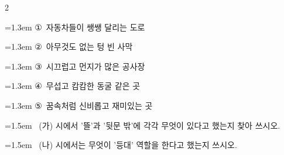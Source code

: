 \documentclass[12pt, a4paper]{article}
\begin{document}
\begin{multicols}{2}
\begin{minipage}{\columnwidth}
\vspace{0.5mm}
{\hangindent=1.3em  \noindent\hspace{0.3em}①~자동차들이 쌩쌩 달리는 도로\par}
{\hangindent=1.3em  \noindent\hspace{0.3em}②~아무것도 없는 텅 빈 사막\par}
{\hangindent=1.3em  \noindent\hspace{0.3em}③~시끄럽고 먼지가 많은 공사장\par}
{\hangindent=1.3em  \noindent\hspace{0.3em}④~무섭고 캄캄한 동굴 같은 곳\par}
{\hangindent=1.3em  \noindent\hspace{0.3em}⑤~꿈속처럼 신비롭고 재미있는 곳\par}
\vspace{4mm}
\end{minipage}
\par

\noindent\begin{minipage}{\columnwidth}
\vspace{2mm}
{\hangindent=1.5em  ~(가) 시에서 '뜰'과 '뒷문 밖'에 각각 무엇이 있다고 했는지 찾아 쓰시오.\par}

\vspace{3mm}
\noindent\hrulefill
\vspace{2.5mm}
\noindent\hrulefill
\vspace{2.5mm}
\noindent\hrulefill
\vspace{2.5mm}
\noindent\hrulefill
\vspace{2.5mm}
\noindent\hrulefill
\vspace{2.5mm}
\vspace{1mm}
\vspace{4mm}
\end{minipage}
\par

\noindent\begin{minipage}{\columnwidth}
\vspace{2mm}
{\hangindent=1.5em  ~(나) 시에서는 무엇이 '등대' 역할을 한다고 했는지 쓰시오.\par}

\vspace{3mm}
\noindent\hrulefill
\vspace{2.5mm}
\noindent\hrulefill
\vspace{2.5mm}
\noindent\hrulefill
\vspace{2.5mm}
\noindent\hrulefill
\vspace{2.5mm}
\noindent\hrulefill
\vspace{2.5mm}
\vspace{1mm}
\vspace{4mm}
\end{minipage}
\par



\end{multicols}
\end{document}
